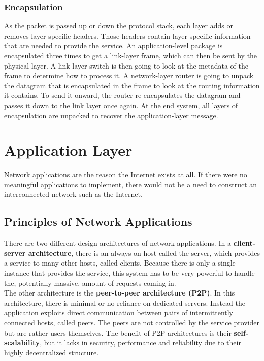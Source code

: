 \subsubsection{Encapsulation}
As the packet is passed up or down the protocol stack, each layer adds or removes layer specific headers. Those headers contain layer specific information that are needed to provide the service. An application-level package is encapsulated three times to get a link-layer frame, which can then be sent by the physical layer. A link-layer switch is then going to look at the metadata of the frame to determine how to process it. A network-layer router is going to unpack the datagram that is encapsulated in the frame to look at the routing information it contains. To send it onward, the router re-encapsulates the datagram and passes it down to the link layer once again. At the end system, all layers of encapsulation are unpacked to recover the application-layer message.

\section{Application Layer}
Network applications are the reason the Internet exists at all. If there were no meaningful applications to implement, there would not be a need to construct an interconnected network such as the Internet.

\subsection{Principles of Network Applications}
There are two different design architectures of network applications. In a \textbf{client-server architecture}, there is an always-on host called the server, which provides a service to many other hosts, called clients. Because there is only a single instance that provides the service, this system has to be very powerful to handle the, potentially massive, amount of requests coming in. \\
The other architecture is the \textbf{peer-to-peer architecture (P2P)}. In this architecture, there is minimal or no reliance on dedicated servers. Instead the application exploits direct communication between pairs of intermittently connected hosts, called peers. The peers are not controlled by the service provider but are rather users themselves. The benefit of P2P architectures is their \textbf{self-scalability}, but it lacks in security, performance and reliability due to their highly decentralized structure.\vspace{.3cm}\\

